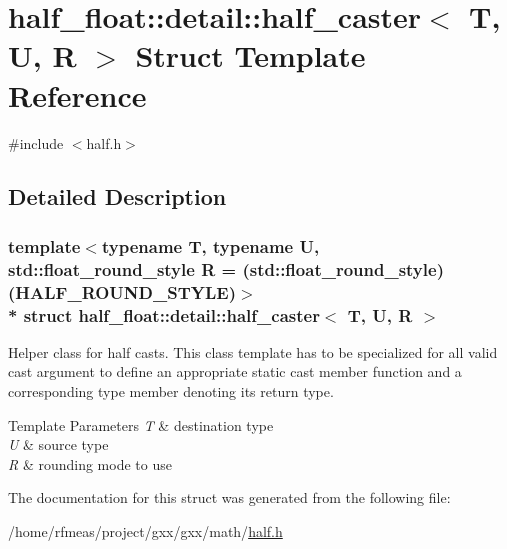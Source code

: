 \hypertarget{structhalf__float_1_1detail_1_1half__caster}{}\section{half\+\_\+float\+:\+:detail\+:\+:half\+\_\+caster$<$ T, U, R $>$ Struct Template Reference}
\label{structhalf__float_1_1detail_1_1half__caster}


{\ttfamily \#include $<$half.\+h$>$}



\subsection{Detailed Description}
\subsubsection*{template$<$typename T, typename U, std\+::float\+\_\+round\+\_\+style R = (std\+::float\+\_\+round\+\_\+style)(\+H\+A\+L\+F\+\_\+\+R\+O\+U\+N\+D\+\_\+\+S\+T\+Y\+L\+E)$>$\\*
struct half\+\_\+float\+::detail\+::half\+\_\+caster$<$ T, U, R $>$}

Helper class for half casts. This class template has to be specialized for all valid cast argument to define an appropriate static {\ttfamily cast} member function and a corresponding {\ttfamily type} member denoting its return type. 
\begin{DoxyTemplParams}{Template Parameters}
{\em T} & destination type \\
\hline
{\em U} & source type \\
\hline
{\em R} & rounding mode to use \\
\hline
\end{DoxyTemplParams}


The documentation for this struct was generated from the following file\+:\begin{DoxyCompactItemize}
\item 
/home/rfmeas/project/gxx/gxx/math/\hyperlink{half_8h}{half.\+h}\end{DoxyCompactItemize}
